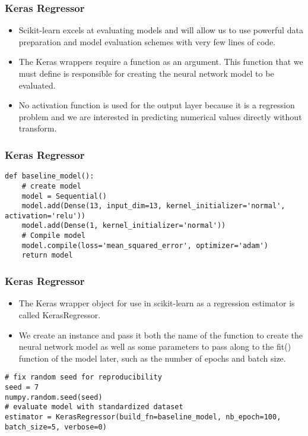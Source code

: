 \begin{frame}[fragile] \frametitle{Keras Regressor}
 \begin{itemize}
 \item Scikit-learn excels at evaluating models and will allow us to use powerful data preparation and model evaluation schemes with very few lines of code.
 \item The Keras wrappers require a function as an argument. This function that we must define is responsible for creating the neural network model to be evaluated.
 \item No activation function is used for the output layer because it is a regression problem and we are interested in predicting numerical values directly without transform.
 \end{itemize}
\end{frame}


\begin{frame}[fragile] \frametitle{Keras Regressor}
 \begin{lstlisting}
def baseline_model():
	# create model
	model = Sequential()
	model.add(Dense(13, input_dim=13, kernel_initializer='normal', activation='relu'))
	model.add(Dense(1, kernel_initializer='normal'))
	# Compile model
	model.compile(loss='mean_squared_error', optimizer='adam')
	return model
\end{lstlisting}
\end{frame}


\begin{frame}[fragile] \frametitle{Keras Regressor}
 \begin{itemize}
 \item The Keras wrapper object for use in scikit-learn as a regression estimator is called KerasRegressor. 
 \item We create an instance and pass it both the name of the function to create the neural network model as well as some parameters to pass along to the fit() function of the model later, such as the number of epochs and batch size.
 \end{itemize}
\begin{lstlisting}
# fix random seed for reproducibility
seed = 7
numpy.random.seed(seed)
# evaluate model with standardized dataset
estimator = KerasRegressor(build_fn=baseline_model, nb_epoch=100, batch_size=5, verbose=0)
\end{lstlisting}
\end{frame}


